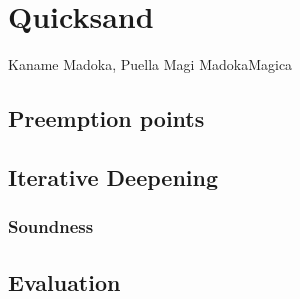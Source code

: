 \chapter{Quicksand}
\label{chap:quicksand}
{Kaname Madoka, Puella Magi Madoka{\raisebox{0.1em}{$\scriptstyle \bigstar$}}Magica}


\section{Preemption points} %
\label{sec:quicksand-pps}

\section{Iterative Deepening}
\label{sec:quicksand-id}

\subsection{Soundness}
\label{sec:quicksand-soundness}

\section{Evaluation}
\label{sec:quicksand-eval}
